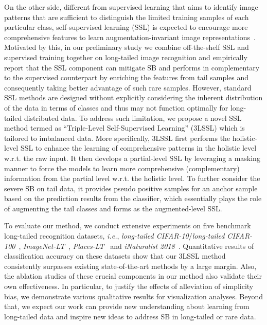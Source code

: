 \documentclass[10pt,journal,compsoc]{IEEEtran}
\newcommand{\ie}{\emph{i.e.}}
\begin{document}
On the other side, different from supervised learning that aims to identify image patterns that are sufficient to distinguish the limited training samples of each particular class, self-supervised learning (SSL) is expected to encourage more comprehensive features to learn augmentation-invariant image representations~\cite{gidaris2019boosting}. Motivated by this, in our preliminary study we combine off-the-shelf SSL and supervised training together on long-tailed image recognition and empirically report that the SSL component can mitigate SB and performs in complementary to the supervised counterpart by enriching the features from tail samples and consequently taking better advantage of such rare samples. However, standard SSL methods are designed without explicitly considering the inherent distribution of the data in terms of classes and thus may not function optimally for long-tailed distributed data. To address such limitation, we propose a novel SSL method termed as ``Triple-Level Self-Supervised Learning'' (3LSSL) which is tailored to imbalanced data. More specifically, 3LSSL first performs the holistic-level SSL to enhance the learning of comprehensive patterns in the holistic level w.r.t. the raw input. It then develops a partial-level SSL by leveraging a masking manner to force the models to learn more comprehensive (complementary) information from the partial level w.r.t. the holistic level. To further consider the severe SB on tail data, it provides pseudo positive samples for an anchor sample based on the prediction results from the classifier, which essentially plays the role of augmenting the tail classes and forms as the augmented-level SSL.

To evaluate our method, we conduct extensive experiments on five benchmark long-tailed recognition datasets, \ie, \emph{long-tailed CIFAR-10}/\emph{long-tailed CIFAR-100}~\cite{cifar}, \emph{ImageNet-LT}~\cite{oltr}, \emph{Places-LT}~\cite{zhou2017places} and \emph{iNaturalist 2018}~\cite{van2018inaturalist}. Quantitative results of classification accuracy on these datasets show that our 3LSSL method consistently surpasses existing state-of-the-art methods by a large margin. Also, the ablation studies of these crucial components in our method also validate their own effectiveness. In particular, to justify the effects of alleviation of simplicity bias, we demonstrate various qualitative results for visualization analyses. Beyond that, we expect our work can provide new understanding about learning from long-tailed data and inspire new ideas to address SB in long-tailed or rare data.  
\end{document}

